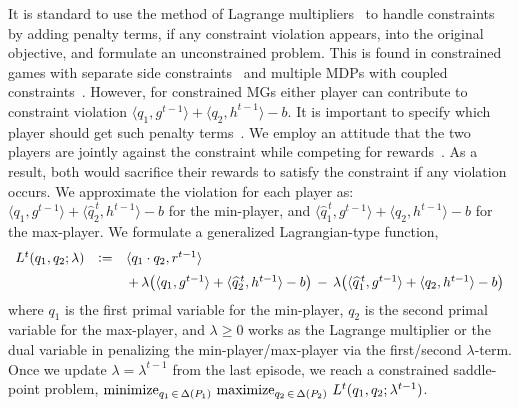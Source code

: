 \documentclass[12pt, final]{l4dc2023}
\begin{document}
It is standard to use the method of Lagrange multipliers~\citep{bertsekas2014constrained} to handle constraints by adding penalty terms, if any constraint violation appears, into the original objective, and formulate an unconstrained problem. This is found in constrained games with separate side constraints~\citep{pearsall1976lagrange} and multiple MDPs with coupled constraints~\citep{boutilier2016budget,wei2018online}. However, for constrained MGs either player can contribute to constraint violation $\langle{q_1},{g^{t-1}} \rangle+\langle{q_2},{h^{t-1}}\rangle- b$. It is important to specify which player should get such penalty terms~\citep{altman2009constrained,dai2020optimality}. We employ an attitude that the two players are jointly against the constraint while competing for rewards~\citep{altman2009constrained}. As a result, both would sacrifice their rewards to satisfy the constraint if any violation occurs. We approximate the violation for each player as: $\langle{q_1},{g^{t-1}}\rangle +\langle{\hat q_2^{\,t} },{h^{t-1}}\rangle- b$ for the min-player, and $\langle{\hat q_1^{\,t}},{g^{t-1}}\rangle +\langle{ q_2},{h^{t-1}}\rangle- b$ for the max-player. We formulate a generalized Lagrangian-type function,
\[
\begin{array}{rcl}
L^t(q_1,q_2;\lambda) 
&\mathrel{\mathop:}=&
\langle{q_1\cdot q_2},{r^{t-1}}\rangle
\\[0.2cm]
&&
\,+\,
\lambda \big( \langle{q_1},{g^{t-1}}\rangle +\langle{\widehat q_2^{\,t} },{h^{t-1}}\rangle- b \big)
\,-\,
\lambda \big( \langle{\widehat q_1^{\,t}},{g^{t-1}}\rangle +\langle{ q_2},{h^{t-1}}\rangle- b \big)
\end{array}
\]
where $q_1$ is the first primal variable for the min-player, $q_2$ is the second primal variable for the max-player, and $\lambda\geq 0$ works as the Lagrange multiplier or the dual variable in penalizing the min-player/max-player via the first/second $\lambda$-term.  Once we update $\lambda=\lambda^{t-1}$ from the last episode, we reach a constrained saddle-point problem, 
$\operatorname*{minimize}_{q_1\,\in\,\Delta(P_1)}\,\operatorname*{maximize}_{q_2\,\in\,\Delta(P_2)}\, L^t(q_1,q_2;\lambda^{t-1})$.
\end{document}
